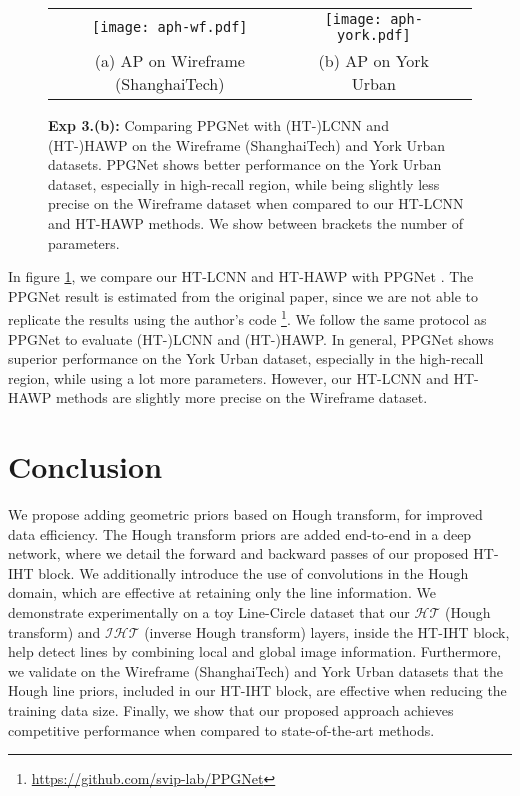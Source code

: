 \documentclass[runningheads]{llncs}
\newcommand{\model}{HT-IHT block\xspace}
\begin{document}
\begin{figure}[t!]
    \centering
    \begin{tabular}{ccc}
        \texttt{[image: aph-wf.pdf]} &
        \texttt{[image: aph-york.pdf]} \\
        \scriptsize{(a) AP on Wireframe (ShanghaiTech)} & 
        \scriptsize{(b) AP on York Urban}\\
    \end{tabular}
    \caption{
    \textbf{Exp 3.(b):} Comparing PPGNet\cite{zhang2019ppgnet} with (HT-)LCNN and (HT-)HAWP on the Wireframe (ShanghaiTech) and York Urban datasets. 
    PPGNet shows better performance on the York Urban dataset, especially in high-recall region, while
    being slightly less precise on the Wireframe dataset when compared to our HT-LCNN and HT-HAWP methods. 
    We show between brackets the number of parameters.}
    \label{fig:exp3_ppg}
\end{figure}

In figure \ref{fig:exp3_ppg}, we compare our HT-LCNN and HT-HAWP with PPGNet \cite{zhang2019ppgnet}. 
The PPGNet result is estimated from the original paper, since we are not able to replicate the results using the author\rq s code \footnote{\url{https://github.com/svip-lab/PPGNet}}. 
We follow the same protocol as PPGNet to evaluate (HT-)LCNN and (HT-)HAWP. 
In general, PPGNet shows superior performance on the York Urban dataset, especially in the high-recall region, while using a lot more parameters.
However, our HT-LCNN and HT-HAWP methods are slightly more precise on the Wireframe dataset.
 \section{Conclusion}
We propose adding geometric priors based on Hough transform, for improved data efficiency.
The Hough transform priors are added end-to-end in a deep network, where we 
detail the forward and backward passes of our proposed \model.
We additionally introduce the use of convolutions in the Hough domain, which are effective at retaining only the line information. 
We demonstrate experimentally on a toy Line-Circle dataset that our $\mathcal{HT}$ (Hough transform) and $\mathcal{IHT}$ (inverse Hough transform) layers, inside the \model, help detect lines by combining local and global image information.
Furthermore, we validate on the Wireframe (ShanghaiTech) and York Urban datasets that the Hough line priors, included in our \model, are effective when reducing the training data size. 
Finally, we show that our proposed approach achieves competitive performance when compared to state-of-the-art methods.
 {
    \small
    
    {}
}
\end{document}
